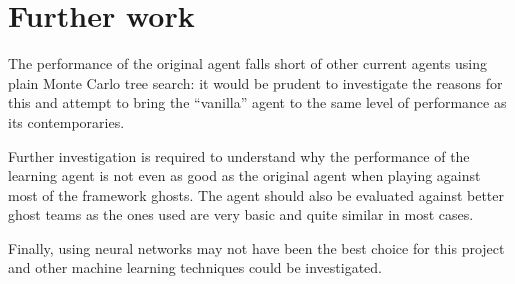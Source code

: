\section{Further work}

The performance of the original agent falls short of other current agents using plain Monte Carlo tree search: it would be prudent to investigate the reasons for this and attempt to bring the ``vanilla'' agent to the same level of performance as its contemporaries.

Further investigation is required to understand why the performance of the learning agent is not even as good as the original agent when playing against most of the framework ghosts.  The agent should also be evaluated against better ghost teams as the ones used are very basic and quite similar in most cases.

Finally, using neural networks may not have been the best choice for this project and other machine learning techniques could be investigated.
